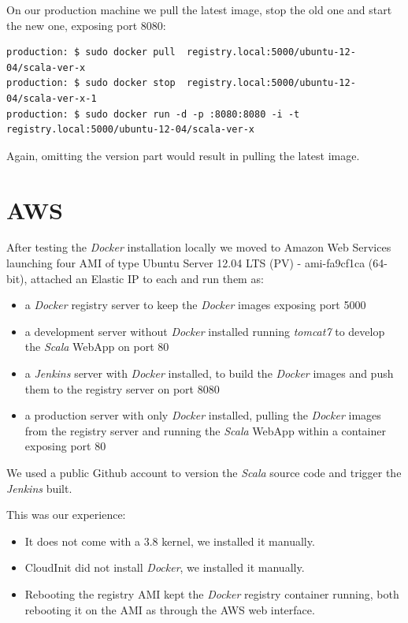\documentclass[captions=tableheading]{article}
\begin{document}
On our production machine we pull the latest image, stop the old one and start the new one, exposing port 8080:

\begin{verbatim}
production: $ sudo docker pull  registry.local:5000/ubuntu-12-04/scala-ver-x
production: $ sudo docker stop  registry.local:5000/ubuntu-12-04/scala-ver-x-1
production: $ sudo docker run -d -p :8080:8080 -i -t  registry.local:5000/ubuntu-12-04/scala-ver-x
\end{verbatim}
Again, omitting the version part would result in pulling the latest image.
\section{AWS}
\label{sec-7}

After testing the \emph{Docker} installation locally we moved to Amazon Web Services launching four AMI  of type Ubuntu Server 12.04 LTS (PV) - ami-fa9cf1ca (64-bit), attached an Elastic IP to each and run them as:
\begin{itemize}
\item a \emph{Docker} registry server to keep the \emph{Docker} images exposing port 5000
\item a development server  without \emph{Docker} installed running \emph{tomcat7} to develop the  \emph{Scala} WebApp on port 80
\item a \emph{Jenkins} server with \emph{Docker} installed, to build the \emph{Docker} images and push them to the registry server on port 8080
\item a production server with only \emph{Docker} installed, pulling the \emph{Docker} images from the registry server and running the  \emph{Scala} WebApp within a container exposing port 80
\end{itemize}
We used a public Github account to version the \emph{Scala} source code and trigger the \emph{Jenkins} built.

This was our experience:
\begin{itemize}
\item It does not come with a 3.8 kernel, we installed it  manually.
\item CloudInit did not install \emph{Docker}, we installed it  manually.
\item Rebooting the registry AMI kept the \emph{Docker} registry container running, both rebooting it on the AMI as through the AWS web interface.
\end{itemize}
\end{document}
